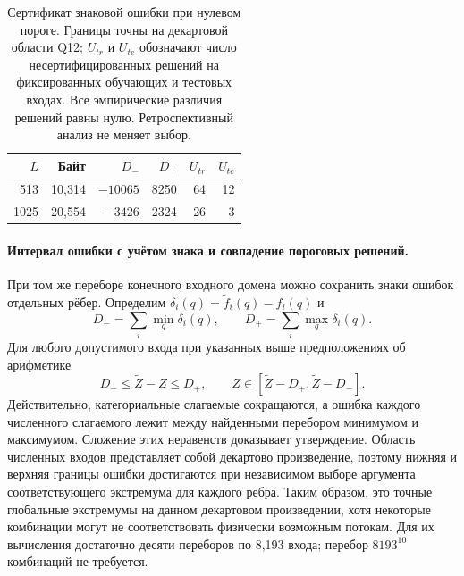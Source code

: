 \begin{table}[t]
\centering\footnotesize\setlength{\tabcolsep}{3pt}
\caption{Сертификат знаковой ошибки при нулевом пороге. Границы точны на декартовой области Q12; $U_{tr}$ и $U_{te}$ обозначают число несертифицированных решений на фиксированных обучающих и тестовых входах. Все эмпирические различия решений равны нулю. Ретроспективный анализ не меняет выбор.}
\label{tab:signed_certificate}
\begin{tabular}{rrrrrr}
\toprule
$L$ & Байт & $D_-$ & $D_+$ & $U_{tr}$ & $U_{te}$\\
\midrule
513 & 10,314 & $-10065$ & 8250 & 64 & 12\\
1025 & 20,554 & $-3426$ & 2324 & 26 & 3\\
\bottomrule
\end{tabular}
\end{table}

\paragraph{Интервал ошибки с учётом знака и совпадение пороговых решений.}
При том же переборе конечного входного домена можно сохранить знаки ошибок
отдельных рёбер. Определим $\delta_i(q)=\widetilde f_i(q)-f_i(q)$ и
\begin{equation}
 D_- = \sum_i\min_q\delta_i(q),\qquad
 D_+ = \sum_i\max_q\delta_i(q).
 \label{eq:signed_error_extrema}
\end{equation}
Для любого допустимого входа при указанных выше предположениях об арифметике
\begin{equation}
 D_-\leq\widetilde Z-Z\leq D_+,
 \qquad Z\in[\widetilde Z-D_+,\widetilde Z-D_-].
 \label{eq:signed_error_interval}
\end{equation}
Действительно, категориальные слагаемые сокращаются, а ошибка каждого
численного слагаемого лежит между найденными перебором минимумом и максимумом.
Сложение этих неравенств доказывает утверждение. Область численных входов
представляет собой декартово произведение, поэтому нижняя и верхняя границы
ошибки достигаются при независимом выборе аргумента соответствующего
экстремума для каждого ребра. Таким образом, это точные глобальные экстремумы
на данном декартовом произведении, хотя некоторые комбинации могут не
соответствовать физически возможным потокам. Для их вычисления достаточно
десяти переборов по 8,193 входа; перебор $8193^{10}$ комбинаций не требуется.

